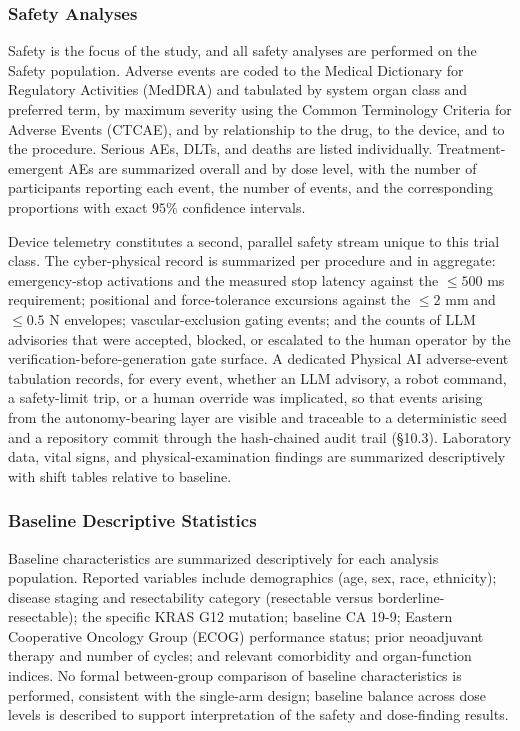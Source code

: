 \subsubsection{Safety Analyses}

Safety is the focus of the study, and all safety analyses are performed on the
Safety population. Adverse events are coded to the Medical Dictionary for
Regulatory Activities (MedDRA) and tabulated by system organ class and preferred
term, by maximum severity using the Common Terminology Criteria for Adverse
Events (CTCAE), and by relationship to the drug, to the device, and to the
procedure. Serious AEs, DLTs, and deaths are listed individually. Treatment-emergent
AEs are summarized overall and by dose level, with the number of participants
reporting each event, the number of events, and the corresponding proportions with
exact $95\%$ confidence intervals.

Device telemetry constitutes a second, parallel safety stream unique to this
trial class. The cyber-physical record is summarized per procedure and in
aggregate: emergency-stop activations and the measured stop latency against the
$\leq 500$ ms requirement; positional and force-tolerance excursions against the
$\leq 2$ mm and $\leq 0.5$ N envelopes; vascular-exclusion gating events; and the
counts of LLM advisories that were accepted, blocked, or escalated to the human
operator by the verification-before-generation gate surface. A dedicated Physical
AI adverse-event tabulation records, for every event, whether an LLM advisory, a
robot command, a safety-limit trip, or a human override was implicated, so that
events arising from the autonomy-bearing layer are visible and traceable to a
deterministic seed and a repository commit through the hash-chained audit trail
(\S10.3). Laboratory data, vital signs, and physical-examination findings are
summarized descriptively with shift tables relative to baseline.

\subsubsection{Baseline Descriptive Statistics}

Baseline characteristics are summarized descriptively for each analysis
population. Reported variables include demographics (age, sex, race, ethnicity);
disease staging and resectability category (resectable versus borderline-resectable);
the specific KRAS G12 mutation; baseline CA 19-9; Eastern Cooperative Oncology
Group (ECOG) performance status; prior neoadjuvant therapy and number of cycles;
and relevant comorbidity and organ-function indices. No formal between-group
comparison of baseline characteristics is performed, consistent with the
single-arm design; baseline balance across dose levels is described to support
interpretation of the safety and dose-finding results.

